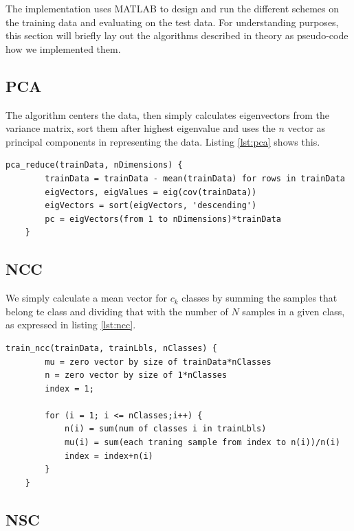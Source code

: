 \documentclass[journal]{IEEEtran}
\begin{document}
The implementation uses MATLAB to design and run the different schemes on the training data and evaluating on the test data. For understanding purposes, this section will briefly lay out the algorithms described in theory as pseudo-code how we implemented them.

\subsection{PCA} 

The algorithm centers the data, then simply calculates eigenvectors from the variance matrix, sort them after highest eigenvalue and uses the $n$ vector as principal components in representing the data. Listing \ref{lst:pca} shows this.

\begin{minipage}[t]{0.95\linewidth}
	\begin{lstlisting}[caption=Implementation of PCA., label={lst:pca}]
	pca_reduce(trainData, nDimensions) {
		trainData = trainData - mean(trainData) for rows in trainData
		eigVectors, eigValues = eig(cov(trainData))
		eigVectors = sort(eigVectors, 'descending')
		pc = eigVectors(from 1 to nDimensions)*trainData
	}
	\end{lstlisting}
\end{minipage}

\subsection{NCC} 

We simply calculate a mean vector for $c_{k}$ classes by summing the samples that belong te class and dividing that with the number of $N$ samples in a given class, as expressed in listing \ref{lst:ncc}.

\begin{minipage}[H]{0.95\linewidth}
	\begin{lstlisting}[caption=Implementation of NCC., label={lst:ncc}]
	train_ncc(trainData, trainLbls, nClasses) {
		mu = zero vector by size of trainData*nClasses
		n = zero vector by size of 1*nClasses
		index = 1;
		
		for (i = 1; i <= nClasses;i++) {
			n(i) = sum(num of classes i in trainLbls)
			mu(i) = sum(each traning sample from index to n(i))/n(i)		
			index = index+n(i)
		}
	}
	\end{lstlisting}
\end{minipage}

\subsection{NSC} 
\end{document}
